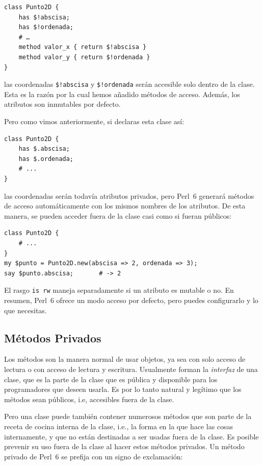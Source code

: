 \begin{lstlisting}
class Punto2D {
    has $!abscisa;
    has $!ordenada;
    # …
    method valor_x { return $!abscisa }
    method valor_y { return $!ordenada }
}
\end{lstlisting}

las coordenadas \verb|$!abscisa| y \verb|$!ordenada|
serán accesible solo dentro de la clase. Esta es la 
razón por la cual hemos añadido métodos de acceso.
Además, los atributos son inmutables por defecto.

Pero como vimos anteriormente, si declaras
esta clase así:

\begin{lstlisting}
class Punto2D {
    has $.abscisa;
    has $.ordenada;
    # ...
}
\end{lstlisting}

las coordenadas serán todavía atributos privados, pero
Perl~6 generará métodos de acceso automáticamente con los
mismos nombres de los atributos. De esta manera, se pueden
acceder fuera de la clase casi como si fueran públicos:

\begin{lstlisting}
class Punto2D {
    # ...
}
my $punto = Punto2D.new(abscisa => 2, ordenada => 3);
say $punto.abscisa;       # -> 2
\end{lstlisting}

El rasgo {\tt is rw} maneja separadamente si un atributo 
es mutable o no. En resumen, Perl~6 ofrece un modo acceso por
defecto, pero puedes configurarlo y lo que necesitas.


\subsection{Métodos Privados}

Los métodos son la manera normal de usar objetos, ya sea con
solo acceso de lectura o con acceso de lectura y escritura. 
Usualmente forman la \emph{interfaz} de una clase, que es la
parte de la clase que es pública y disponible para los programadores que deseen usarla. Es por lo tanto natural y legítimo que los métodos sean públicos, i.e, accesibles fuera
de la clase.

Pero una clase puede también contener numerosos métodos
que son parte de la receta de cocina interna de la clase, i.e.,
la forma en la que hace las cosas internamente, y que no están
destinadas a ser usadas fuera de la clase. Es posible prevenir 
su uso fuera de la clase al hacer estos métodos privados. 
Un método privado de Perl~6 se prefija con un signo de 
exclamación:

